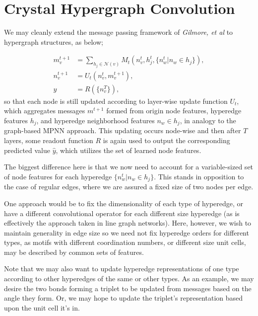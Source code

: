 \documentclass[10pt,a4paper]{article}
\begin{document}
\section{Crystal Hypergraph Convolution}

We may cleanly extend the message passing framework of \textit{Gilmore, et al} \cite{mpnn} to hypergraph structures, as below;

\begin{align*}
m_v^{t+1}&=\sum_{h_j\in \mathcal{N}(v)} M_t(n_v^{t},h_j^{t},\lbrace n_w^t \vert n_w \in h_j \rbrace),\\
n_v^{t+1}&=U_t(n_v^t,m_v^{t+1}),\\
\hat{y}&=R(\lbrace n_v^T\rbrace),
\end{align*}
so that each node is still updated according to layer-wise update function $U_t$, which aggregates messages $m^{t+1}$ formed from origin node features, hyperedge features $h_j$, and hyperedge neighborhood features $n_w \in h_j$, in analogy to the graph-based MPNN approach. This updating occurs node-wise and then after $T$ layers, some readout function $R$ is again used to output the corresponding predicted value $\hat{y}$, which utilizes the set of learned node features.


  
The biggest difference here is that we now need to account for a variable-sized set of node features for each hyperedge $\lbrace n_w^t \vert n_w \in h_j \rbrace$. This stands in opposition to the case of regular edges, where we are assured a fixed size of two nodes per edge. 

One approach would be to fix the dimensionality of each type of hyperedge, or have a different convolutional operator for each different size hyperedge (as is effectively the approach taken in line graph networks). Here, however, we wish to maintain generality in edge size so we need not fix hyperedge orders for different types, as motifs with different coordination numbers, or different size unit cells, may be described by common sets of features.

Note that we may also want to update hyperedge representations of one type according to other hyperedges of the same or other types. As an example, we may desire the two bonds forming a triplet to be updated from messages based on the angle they form. Or, we may hope to update the triplet's representation based upon the unit cell it's in. 
\end{document}
